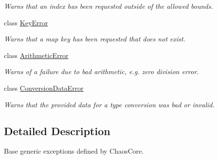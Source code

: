 \begin{DoxyCompactItemize}
\begin{DoxyCompactList}\small\item\em Warns that an index has been requested outside of the allowed bounds. \end{DoxyCompactList}\item 
class \hyperlink{classchaos_1_1ex_1_1_key_error}{Key\-Error}
\begin{DoxyCompactList}\small\item\em Warns that a map key has been requested that does not exist. \end{DoxyCompactList}\item 
class \hyperlink{classchaos_1_1ex_1_1_arithmetic_error}{Arithmetic\-Error}
\begin{DoxyCompactList}\small\item\em Warns of a failure due to bad arithmetic, e.\-g. zero division error. \end{DoxyCompactList}\item 
class \hyperlink{classchaos_1_1ex_1_1_conversion_data_error}{Conversion\-Data\-Error}
\begin{DoxyCompactList}\small\item\em Warns that the provided data for a type conversion was bad or invalid. \end{DoxyCompactList}\end{DoxyCompactItemize}


\subsection{Detailed Description}
Base generic exceptions defined by Chaos\-Core. 